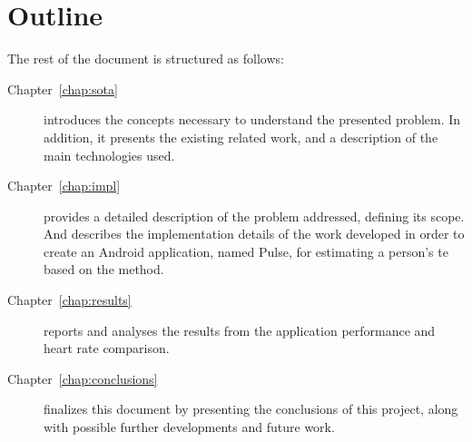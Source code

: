 \section{Outline} \label{sec:intro:outline}

The rest of the document is structured as follows:

\begin{description}
  \item[Chapter~\ref{chap:sota}] introduces the concepts necessary to
        understand the presented problem. In addition, it presents
        the existing related work, and a description of the main
        technologies used.
  \item[Chapter~\ref{chap:impl}] provides a detailed description of the
        problem addressed, defining its scope. And describes the implementation
        details of the
        work developed in order to create an Android application, named Pulse,
        for estimating a person's te based on the \evm{} method.
  \item[Chapter~\ref{chap:results}] reports and analyses the results from
        the application performance and heart rate comparison.
  \item[Chapter~\ref{chap:conclusions}] finalizes this document by presenting
        the conclusions of this project, along with possible further
        developments and future work.
\end{description}
